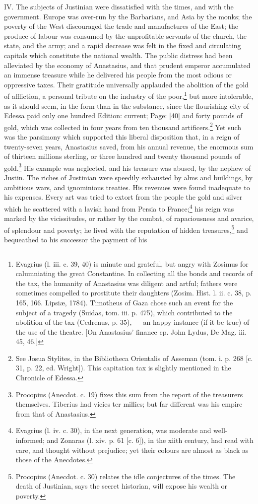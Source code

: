 IV. The subjects of Justinian were dissatisfied with the times, and with the government. Europe was over-run by the Barbarians, and Asia by the monks; the poverty of the West discouraged the trade and manufactures of the East; the produce of labour was consumed by the unprofitable servants of the church, the state, and the army; and a rapid decrease was felt in the fixed and circulating capitals which constitute the national wealth. The public distress had been alleviated by the economy of Anastasius, and that prudent emperor accumulated an immense treasure while he delivered his people from the most odious or oppressive taxes. Their gratitude universally applauded the abolition of the gold of affliction, a personal tribute on the industry of the poor,\footnote{Evagrius (l. iii. c. 39, 40) is minute and grateful, but angry with Zosimus for calumniating the great Constantine. In collecting all the bonds and records of the tax, the humanity of Anastasius was diligent and artful; fathers were sometimes compelled to prostitute their daughters (Zosim. Hist. l. ii. c. 38, p. 165, 166. Lipsiæ, 1784). Timotheus of Gaza chose such an event for the subject of a tragedy (Suidas, tom. iii. p. 475), which contributed to the abolition of the tax (Cedrenus, p. 35), \texthebrew{—} an happy instance (if it be true) of the use of the theatre. [On Anastasius\texthebrew{}’ finance cp. John Lydus, De Mag. iii. 45, 46.]} but more intolerable, as it should seem, in the form than in the substance, since the flourishing city of Edessa paid only one hundred Edition: current; Page: [40] and forty pounds of gold, which was collected in four years from ten thousand artificers.\footnote{See Josua Stylites, in the Bibliotheca Orientalis of Asseman (tom. i. p. 268 [c. 31, p. 22, ed. Wright]). This capitation tax is slightly mentioned in the Chronicle of Edessa.} Yet such was the parsimony which supported this liberal disposition that, in a reign of twenty-seven years, Anastasius saved, from his annual revenue, the enormous sum of thirteen millions sterling, or three hundred and twenty thousand pounds of gold.\footnote{Procopius (Anecdot. c. 19) fixes this sum from the report of the treasurers themselves. Tiberius had vicies ter millies; but far different was his empire from that of Anastasius.} His example was neglected, and his treasure was abused, by the nephew of Justin. The riches of Justinian were speedily exhausted by alms and buildings, by ambitious wars, and ignominious treaties. His revenues were found inadequate to his expenses. Every art was tried to extort from the people the gold and silver which he scattered with a lavish hand from Persia to France;\footnote{Evagrius (l. iv. c. 30), in the next generation, was moderate and well-informed; and Zonaras (l. xiv. p. 61 [c. 6]), in the xiith century, had read with care, and thought without prejudice; yet their colours are almost as black as those of the Anecdotes.} his reign was marked by the vicissitudes, or rather by the combat, of rapaciousness and avarice, of splendour and poverty; he lived with the reputation of hidden treasures,\footnote{Procopius (Anecdot. c. 30) relates the idle conjectures of the times. The death of Justinian, says the secret historian, will expose his wealth or poverty.} and bequeathed to his successor the payment of his 